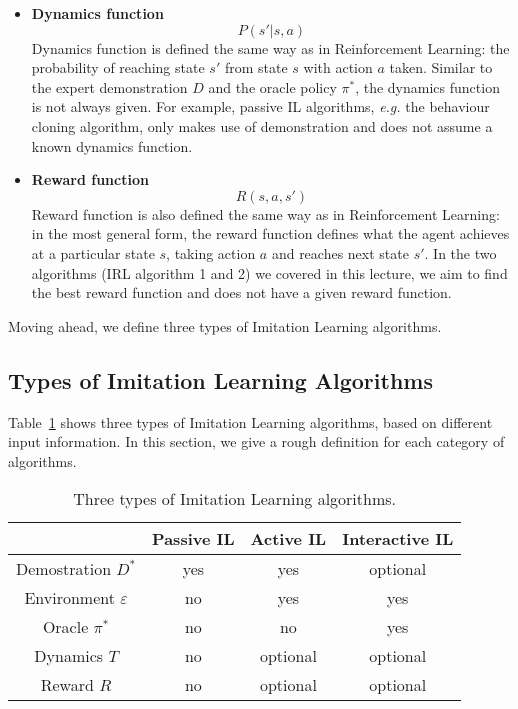\documentclass[11pt]{article}
\begin{document}
\begin{itemize}
    \item \textbf{Dynamics function}
    \begin{equation}
        P(s'|s,a)
    \end{equation}
    Dynamics function is defined the same way as in Reinforcement Learning: the probability of reaching state $s'$ from state $s$ with action $a$ taken. Similar to the expert demonstration $D$ and the oracle policy $\pi^*$, the dynamics function is not always given. For example, passive IL algorithms, \textit{e.g.} the behaviour cloning algorithm, only makes use of demonstration and does not assume a known dynamics function.
    \item \textbf{Reward function}
    \begin{equation}
        R(s,a,s')
    \end{equation}
    Reward function is also defined the same way as in Reinforcement Learning: in the most general form, the reward function defines what the agent achieves at a particular state $s$, taking action $a$ and reaches next state $s'$. In the two algorithms (IRL algorithm 1 and 2) we covered in this lecture, we aim to find the best reward function and does not have a given reward function.
\end{itemize}

Moving ahead, we define three types of Imitation Learning algorithms.

\subsection{Types of Imitation Learning Algorithms}
Table~\ref{tab:type} shows three types of Imitation Learning algorithms, based on different input information. In this section, we give a rough definition for each category of algorithms.
\begin{table}[h]
\centering
\begin{tabular}{|c|c|c|c|}
\hline
                       & Passive IL & Active IL & Interactive IL \\ \hline
Demostration $D^*$     & yes        & yes       & optional       \\ \hline
Environment $\varepsilon$ & no         & yes       & yes            \\ \hline
Oracle $\pi^*$           & no         & no        & yes            \\ \hline
Dynamics $T$             & no         & optional  & optional       \\ \hline
Reward $R$               & no         & optional  & optional       \\ \hline
\end{tabular}
\caption{Three types of Imitation Learning algorithms.}
\label{tab:type}
\end{table}
\end{document}
